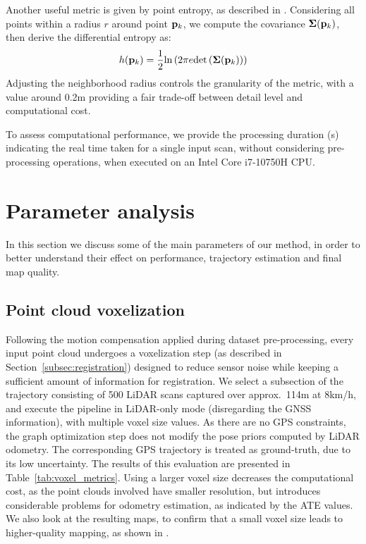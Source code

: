 \newcommand{\pk}{\vecx{p}_k}
Another useful metric is given by point entropy, as described in \cite{adolfsson2021coral}. Considering all points within a radius $r$ around point $\pk$, we compute the covariance $\matx{\Sigma}(\pk)$, then derive the differential entropy as:
\begin{equation}
    h(\pk) = \frac{1}{2}\text{ln}\left(
    2\pi e \text{det}\left(\matx{\Sigma}(\pk)\right)
    \right)
\end{equation}
Adjusting the neighborhood radius controls the granularity of the metric, with a value around 0.2m providing a fair trade-off between detail level and computational cost.

To assess computational performance, we provide the processing duration (s) indicating the real time taken for a single input scan, without considering pre-processing operations, when executed on an Intel Core i7-10750H CPU.



\section{Parameter analysis}

In this section we discuss some of the main parameters of our method, in order to better understand their effect on performance, trajectory estimation and final map quality.
\subsection{Point cloud voxelization}
Following the motion compensation applied during dataset pre-processing, every input point cloud undergoes a voxelization step (as described in Section~\ref{subsec:registration}) designed to reduce sensor noise while keeping a sufficient amount of information for registration. We select a subsection of the trajectory consisting of 500 LiDAR scans captured over approx.~114m at 8km/h, and execute the pipeline in LiDAR-only mode (disregarding the GNSS information), with multiple voxel size values. As there are no GPS constraints, the graph optimization step does not modify the pose priors computed by LiDAR odometry. The corresponding GPS trajectory is treated as ground-truth, due to its low uncertainty. The results of this evaluation are presented in Table~\ref{tab:voxel_metrics}. Using a larger voxel size decreases the computational cost, as the point clouds involved have smaller resolution, but introduces considerable problems for odometry estimation, as indicated by the ATE values. We also look at the resulting maps, to confirm that a small voxel size leads to higher-quality mapping, as shown in .

